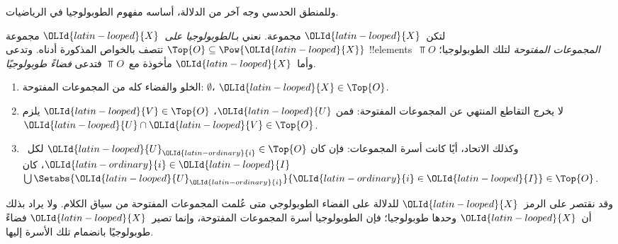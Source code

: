 \documentclass[../../../include/open-logic-section]{subfiles}
\begin{document}


وللمنطق الحدسي وجه آخر من الدلالة، أساسه مفهوم الطوبولوجيا في الرياضيات.

\begin{defn}
  لتكن~$\OLId{latin-looped}{X}$ مجموعة. نعني بـ\emph{الطوبولوجيا على~$\OLId{latin-looped}{X}$} مجموعة
  $\Top{O}\subseteq\Pow{\OLId{latin-looped}{X}}$ تتصف بالخواص المذكورة أدناه. وتدعى
  !!{element}s~$\Top{O}$ \emph{المجموعات المفتوحة} لتلك الطوبولوجيا؛
  وأما~$\OLId{latin-looped}{X}$ مأخوذة مع~$\Top{O}$ فتدعى \emph{فضاءً طوبولوجيًا}.
  \begin{enumerate}
  \item الخلو والفضاء كله من المجموعات المفتوحة:
    $\emptyset$، $\OLId{latin-looped}{X} \in \Top{O}$.
  \item لا يخرج التقاطع المنتهي عن المجموعات المفتوحة: فمن
    $\OLId{latin-looped}{U}$، $\OLId{latin-looped}{V} \in \Top{O}$ يلزم~$\OLId{latin-looped}{U} \cap \OLId{latin-looped}{V} \in \Top{O}$.
  \item وكذلك الاتحاد، أيًا كانت أسرة المجموعات: فإن كان
    $\OLId{latin-looped}{U}_\OLId{latin-ordinary}{i} \in \Top{O}$ لكل~$\OLId{latin-ordinary}{i} \in \OLId{latin-looped}{I}$، كان
    $\bigcup \Setabs{\OLId{latin-looped}{U}_\OLId{latin-ordinary}{i}}{\OLId{latin-ordinary}{i} \in \OLId{latin-looped}{I}} \in \Top{O}$.
  \end{enumerate}
\end{defn}

وقد نقتصر على الرمز~$\OLId{latin-looped}{X}$ للدلالة على الفضاء الطوبولوجي متى عُلمت المجموعات
المفتوحة من سياق الكلام. ولا يراد بذلك أن~$\OLId{latin-looped}{X}$ وحدها طوبولوجيا؛ فإن
الطوبولوجيا أسرة المجموعات المفتوحة، وإنما تصير~$\OLId{latin-looped}{X}$ فضاءً طوبولوجيًا
بانضمام تلك الأسرة إليها.
\end{document}
